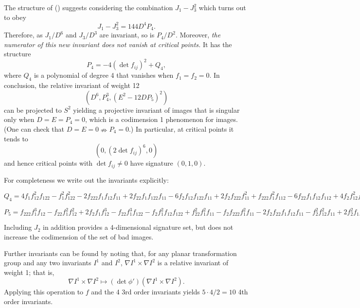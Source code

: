 \documentclass{article}
\begin{document}
The structure of () suggests considering the combination $J_1 - J_3^2$ which turns out to obey
$$J_1 - J_3^2 = 144 D^4 P_4.$$
Therefore, as $J_1/D^6$ and $J_3/D^3$ are invariant, so is $P_4/D^2$. 
Moreover, {\em the numerator of this new invariant does not vanish at critical points.} 
It has the structure
$$P_4 = -4(\det f_{ij})^2 + Q_4,$$
where $Q_4$ is a polynomial of degree 4 that vanishes when $f_1=f_2=0$. In conclusion, the
relative invariant of weight 12
$$ (D^6, P_4^3, (E^2-12D P_5)^2)$$
can be projected to $S^2$ yielding a projective invariant of images that
is singular only when $D=E=P_4=0$, which is a codimension 1 phenomenon for images.
(One can check that $D=E=0\nRightarrow P_4=0$.) In particular, at critical points it tends to
$$ (0, (2\det f_{ij})^6, 0)$$
and hence critical points with $\det f_{ij}\ne 0$ have signature $(0,1,0)$.

For completeness we write out the invariants explicitly:

$Q_4=4 f_1  f_{12} ^2 f_{122}  - 
f_1 ^2 f_{122} ^2 - 
 2 f_{222}  f_1  f_{12}  f_{11}  + 
 2 f_{22}  f_1  f_{122}  f_{11}  - 
 6 f_{2}  f_{12}  f_{122}  f_{11}  + 
 2 f_{2}  f_{222}  f_{11} ^2 + 
 f_{222}  f_1 ^2 f_{112}  - 
 6 f_{22}  f_1  f_{12}  f_{112}  + 
 4 f_{2}  f_{12} ^2 f_{112}  + 
 f_{2}  f_1  f_{122}  f_{112}  + 
 2 f_{2}  f_{22}  f_{11}  f_{112}  - 
 f_{2} ^2 f_{112} ^2 + 
 2 f_{22} ^2 f_1  f_{111}  - 
 f_{2}  f_{222}  f_1  f_{111}  - 
 2 f_{2}  f_{22}  f_{12}  f_{111}  + f_{2} ^2 f_{122}  f_{111} $
 
$P_5=f_{222}  f_{1} ^3 f_{12}  - 
f_{22}  f_{1} ^2 f_{12} ^2 + 
 2 f_{2}  f_{1}  f_{12} ^3 - 
 f_{22}  f_{1} ^3 f_{122}  - 
 f_{2}  f_{1} ^2 f_{12}  f_{122}  + 
 f_{22} ^2 f_{1} ^2 f_{11}  - 
 f_{2}  f_{222}  f_{1} ^2 f_{11}  - 
 2 f_{2}  f_{22}  f_{1}  f_{12}  f_{11}  - 
 f_{2} ^2 f_{12} ^2 f_{11}  + 
 2 f_{2} ^2 f_{1}  f_{122}  f_{11}  + 
 f_{2} ^2 f_{22}  f_{11} ^2 + 
 2 f_{2}  f_{22}  f_{1} ^2 f_{112}  - 
 f_{2} ^2 f_{1}  f_{12}  f_{112}  - 
 f_{2} ^3 f_{11}  f_{112}  - 
 f_{2} ^2 f_{22}  f_{1}  f_{111}  + 
 f_{2} ^3 f_{12}  f_{111} $
 
 Including $J_2$ in addition provides a 4-dimensional signature set, but does not increase
 the codimension of the set of bad images.
 
Further invariants can be found by noting that, for any planar transformation group and any two invariants
$I^1$ and $I^2$, $\nabla I^1 \times \nabla I^2$ is a relative invariant of weight 1; that is,
$$\nabla I^1 \times \nabla I^2\mapsto (\det \phi')(\nabla I^1 \times \nabla I^2).$$
Applying this operation to $f$ and the 4 3rd order invariants yields $5\cdot4/2=1$0  4th order invariants.
\end{document}
